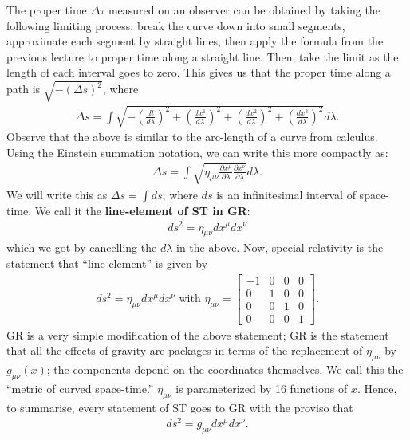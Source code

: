 \documentclass[11pt]{article}
\newcommand{\srmetric}[0]{\eta_{\mu \nu}}
\newcommand{\grmetric}[0]{g_{\mu \nu}}
\theoremstyle{definition}
\begin{document}
The proper time \( \Delta \tau \) measured on an observer can be obtained by taking the following limiting process: break the curve down into small segments, approximate each segment by straight lines, then apply the formula from the previous lecture to proper time along a straight line. Then, take the limit as the length of each interval goes to zero. This gives us that the proper time along a path is \( \sqrt{-(\Delta s)^2 } \), where
\begin{align}
	\Delta s = \int \sqrt{- \left( \frac{dt}{d \lambda} \right)^2 + \left(  \frac{dx^1}{d \lambda} \right)^2 + \left(  \frac{dx^2}{d  \lambda} \right)^2 + \left(  \frac{dx^3}{d \lambda} \right)^2} d \lambda. 
\end{align}
Observe that the above is similar to the arc-length of a curve from calculus. Using the Einstein summation notation, we can write this more compactly as: 
\begin{align}
\Delta s= \int \sqrt{\srmetric \frac{\partial x^\mu}{\partial \lambda} \frac{\partial x^\nu}{\partial \lambda}} d \lambda. 	
\end{align}
We will write this as \( \Delta s= \int ds \), where \( ds \) is an infinitesimal interval of space-time. We call it the \textbf{line-element of ST in GR}: 
\begin{align*}
	ds^2 = \srmetric dx^\mu dx^\nu 
\end{align*}
which we got by cancelling the \( d \lambda \) in the above. Now, special relativity is the statement that ``line element'' is given by
\begin{align*}
	ds^2 = \srmetric dx^\mu dx^\nu  \text{ with } \srmetric = \begin{bmatrix}
		-1 & 0 & 0 & 0 \\
		0 & 1 & 0 & 0 \\
		0 & 0 & 1 & 0 \\
		0 & 0 & 0 & 1
	\end{bmatrix}.
\end{align*}
GR is a very simple modification of the above statement; GR is the statement that all the effects of gravity are packages in terms of the replacement of \( \srmetric \) by \( \grmetric(x) \); the components depend on the coordinates themselves. We call this the ``metric of curved space-time.'' \( \srmetric \) is parameterized by 16 functions of \( x \). Hence, to summarise, every statement of ST goes to GR with the proviso that 
\begin{align}
	ds^2 = \grmetric dx^\mu dx^\nu. 	
\end{align}
\end{document}
